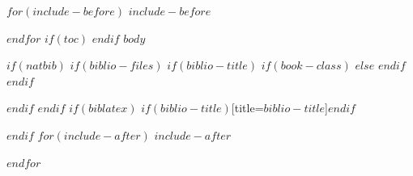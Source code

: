 \documentclass[$if(fontsize)$$fontsize$,$endif$$if(lang)$$lang$,$endif$]{$documentclass$}
\begin{document}

$for(include-before)$
$include-before$

$endfor$
$if(toc)$
{
\hypersetup{linkcolor=black}
\setcounter{tocdepth}{$toc-depth$}
\tableofcontents
\pagebreak
}
$endif$
$body$

$if(natbib)$
$if(biblio-files)$
$if(biblio-title)$
$if(book-class)$
\renewcommand\bibname{$biblio-title$}
$else$
\renewcommand\refname{$biblio-title$}
$endif$
$endif$


$endif$
$endif$
$if(biblatex)$
\printbibliography$if(biblio-title)$[title=$biblio-title$]$endif$

$endif$
$for(include-after)$
$include-after$

$endfor$
\end{document}
